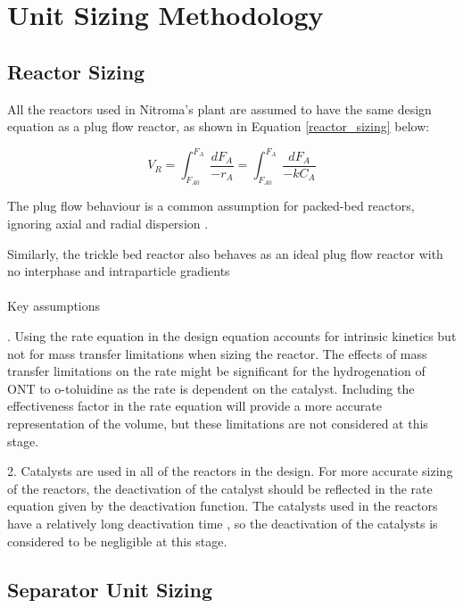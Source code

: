 \section{Unit Sizing Methodology}
\label{app:sizing}
\subsection{Reactor Sizing}

All the reactors used in Nitroma's plant are assumed to have the same design equation as a plug flow reactor, as shown in Equation \ref{reactor_sizing} below:

\begin{equation}
    V_R = \int_{F_{A0}}^{F_{A}} \frac{dF_A}{-r_A} = \int_{F_{A0}}^{F_{A}} \frac{dF_A}{-kC_A}
    \label{reactor_sizing}
\end{equation}

The plug flow behaviour is a common assumption for packed-bed reactors, ignoring axial and radial dispersion \cite{froment_chemical_nodate}.

Similarly, the trickle bed reactor also behaves as an ideal plug flow reactor with no interphase and intraparticle gradients \cite{p_a_ramachandran_recent_1987} 

\paragraph{}{Key assumptions}
 
.  Using the rate equation in the design equation accounts for intrinsic kinetics but not for mass transfer limitations when sizing the reactor. The effects of mass transfer limitations on the rate might be significant for the hydrogenation of ONT to o-toluidine as the rate is dependent on the catalyst. Including the effectiveness factor in the rate equation will provide a more accurate representation of the volume, but these limitations are not considered at this stage.

2.  Catalysts are used in all of the reactors in the design. For more accurate sizing of the reactors, the deactivation of the catalyst should be reflected in the rate equation given by the deactivation function. The catalysts used in the reactors have a relatively long deactivation time \cite{temizel_novel_2020}, so the deactivation of the catalysts is considered to be negligible at this stage. 

\subsection{Separator Unit Sizing}


